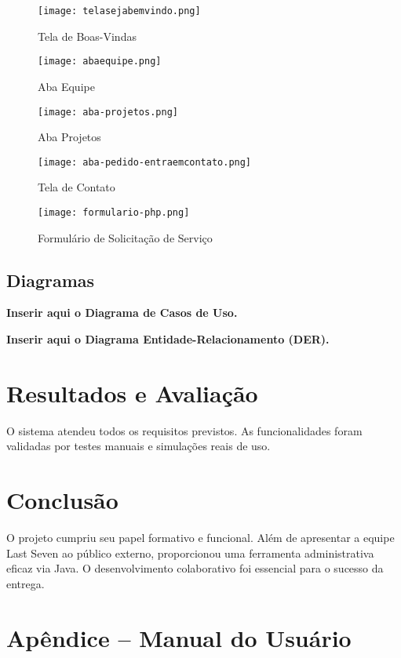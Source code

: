\documentclass[12pt]{article}
\begin{document}
\begin{figure}[H]
    \centering
    \texttt{[image: telasejabemvindo.png]}
    \caption{Tela de Boas-Vindas}
\end{figure}

\begin{figure}[H]
    \centering
    \texttt{[image: abaequipe.png]}
    \caption{Aba Equipe}
\end{figure}

\begin{figure}[H]
    \centering
    \texttt{[image: aba-projetos.png]}
    \caption{Aba Projetos}
\end{figure}

\begin{figure}[H]
    \centering
    \texttt{[image: aba-pedido-entraemcontato.png]}
    \caption{Tela de Contato}
\end{figure}

\begin{figure}[H]
    \centering
    \texttt{[image: formulario-php.png]}
    \caption{Formulário de Solicitação de Serviço}
\end{figure}

\subsection{Diagramas}
\textbf{Inserir aqui o Diagrama de Casos de Uso.}

\textbf{Inserir aqui o Diagrama Entidade-Relacionamento (DER).}

\section{Resultados e Avaliação}
O sistema atendeu todos os requisitos previstos. As funcionalidades foram validadas por testes manuais e simulações reais de uso.

\section{Conclusão}
O projeto cumpriu seu papel formativo e funcional. Além de apresentar a equipe Last Seven ao público externo, proporcionou uma ferramenta administrativa eficaz via Java. O desenvolvimento colaborativo foi essencial para o sucesso da entrega.

\section*{Apêndice – Manual do Usuário}
\end{document}
